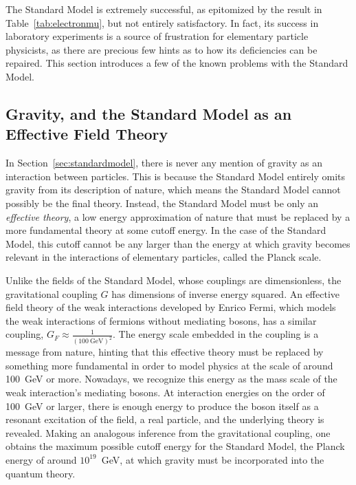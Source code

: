 The Standard Model is extremely successful, as epitomized by the result in Table~\ref{tab:electronmu}, but not entirely satisfactory.
In fact, its success in laboratory experiments is a source of frustration for elementary particle physicists, as there are precious few hints as to how its deficiencies can be repaired.
This section introduces a few of the known problems with the Standard Model.

  \subsection{Gravity, and the Standard Model as an Effective Field Theory} \label{sec:gravity}

  In Section~\ref{sec:standardmodel}, there is never any mention of gravity as an interaction between particles.
  This is because the Standard Model entirely omits gravity from its description of nature, which means the Standard Model cannot possibly be the final theory.
  Instead, the Standard Model must be only an {\it effective theory}, a low energy approximation of nature that must be replaced by a more fundamental theory at some cutoff energy.
  In the case of the Standard Model, this cutoff cannot be any larger than the energy at which gravity becomes relevant in the interactions of elementary particles, called the Planck scale.

  Unlike the fields of the Standard Model, whose couplings are dimensionless, the gravitational coupling $G$ has dimensions of inverse energy squared.
  An effective field theory of the weak interactions developed by Enrico Fermi, which models the weak interactions of fermions without mediating bosons, has a similar coupling, $G_F \approx \frac{1}{(100\mathrm{~GeV})^2}$.
  The energy scale embedded in the coupling is a message from nature, hinting that this effective theory must be replaced by something more fundamental in order to model physics at the scale of around 100~GeV or more.
  Nowadays, we recognize this energy as the mass scale of the weak interaction's mediating bosons.
  At interaction energies on the order of 100~GeV or larger, there is enough energy to produce the boson itself as a resonant excitation of the field, a real particle, and the underlying theory is revealed.
  Making an analogous inference from the gravitational coupling, one obtains the maximum possible cutoff energy for the Standard Model, the Planck energy of around $10^{19}$~GeV, at which gravity must be incorporated into the quantum theory.


